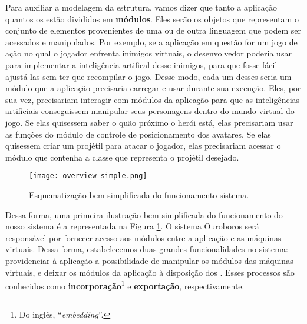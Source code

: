     Para auxiliar a modelagem da estrutura, vamos dizer que tanto a aplicação
    quantos os  estão divididos em \textbf{módulos}. Eles serão os
    objetos que representam o conjunto de elementos provenientes de uma ou de
    outra linguagem que podem ser acessados e manipulados. Por exemplo, se a
    aplicação em questão for um jogo de ação no qual o jogador enfrenta inimigos
    virtuais, o desenvolvedor poderia usar  para implementar a
    inteligência artifical desse inimigos, para que fosse fácil ajustá-las sem
    ter que recompilar o jogo. Desse modo, cada um desses  seria um
    módulo que a aplicação precisaria carregar e usar durante sua execução.
    Eles, por sua vez, precisariam interagir com módulos da aplicação para que
    as inteligências artificiais conseguissem manipular seus personagens dentro
    do mundo virtual do jogo. Se elas quisessem saber o quão próximo o herói
    está, elas precisariam usar as funções do módulo de controle de
    posicionamento dos avatares. Se elas quisessem criar um projétil para atacar
    o jogador, elas precisariam acessar o módulo que contenha a classe que
    representa o projétil desejado.

    \begin{figure}[ht]
      \centering
      \texttt{[image: overview-simple.png]}
      \caption{Esquematização bem simplificada do funcionamento sistema.}
      \label{fig:overview-simple}
    \end{figure}

    Dessa forma, uma primeira ilustração bem simplificada do funcionamento do
    nosso sistema é a representada na Figura \ref{fig:overview-simple}. O
    sistema Ouroboros será responsável por fornecer acesso aos módulos entre a
    aplicação e as máquinas virtuais. Dessa forma, estabelecemos duas
    grandes funcionalidades no sistema: providenciar à aplicação a possibilidade
    de manipular os módulos das máquinas virtuais, e deixar os módulos da
    aplicação à disposição dos  . Esses processos são conhecidos como
    \textbf{incorporação}\footnote{Do inglês, ``\textit{embedding}''.} e
    \textbf{exportação}, respectivamente.


